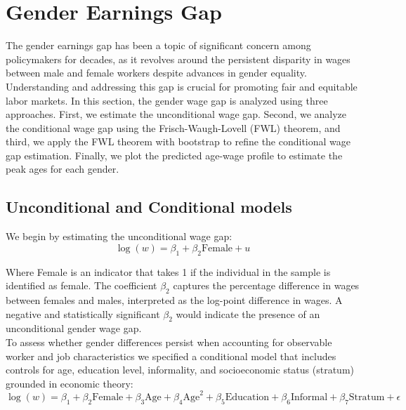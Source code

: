 \documentclass[a4paper,12pt]{article}
\begin{document}
\section{Gender Earnings Gap}
The gender earnings gap has been a topic of significant concern among policymakers for decades, as it revolves around the persistent disparity in wages between male and female workers despite advances in gender equality. Understanding and addressing this gap is crucial for promoting fair and equitable labor markets. In this section, the gender wage gap is analyzed using three approaches. First, we estimate the unconditional wage gap. Second, we analyze the conditional wage gap using the Frisch-Waugh-Lovell (FWL) theorem, and third, we apply the FWL theorem with bootstrap to refine the conditional wage gap estimation. Finally, we plot the predicted age-wage profile to estimate the peak ages for each gender.

\subsection{ Unconditional and Conditional models}
We begin by estimating the unconditional wage gap:
\begin{equation}
    \log(w) = \beta_1 + \beta_2 \text{Female} + u
\end{equation}

Where Female is an indicator that takes 1 if the individual in the sample is
identified as female. 
The coefficient $\beta_2$ captures the percentage difference in wages between females and males, interpreted as the log-point difference in wages. A negative and statistically significant $\beta_2$ would indicate the presence of an unconditional gender wage gap.\\

To assess whether gender differences persist when accounting for observable worker and job characteristics we specified a conditional model that includes controls for age, education level, informality, and socioeconomic status (stratum) grounded in economic theory:
\begin{equation}
\log(w) = \beta_1+ \beta_2 \text{Female} + \beta_3 \text{Age} + \beta_4 \text{Age}^2 + \beta_5 \text{Education} + \beta_6 \text{Informal} + \beta_7 \text{Stratum} + \epsilon
\end{equation}
\end{document}
